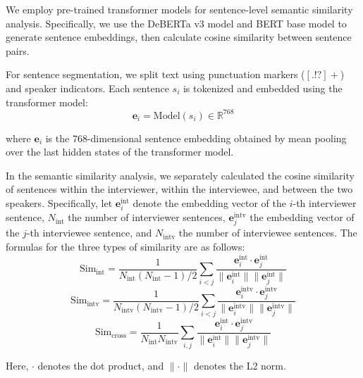 \documentclass[sigchi,nonacm,manuscript]{acmart}
\begin{document}
We employ pre-trained transformer models for sentence-level semantic similarity analysis. Specifically, we use the DeBERTa v3 model \citep{heDeBERTaV3ImprovingDeBERTa2021} and BERT base model \citep{devlinBERTPretrainingDeep2018} to generate sentence embeddings, then calculate cosine similarity between sentence pairs.

For sentence segmentation, we split text using punctuation markers ($[.!?]+$) and speaker indicators. Each sentence $s_i$ is tokenized and embedded using the transformer model:
\begin{equation}
\mathbf{e}_i = \text{Model}(s_i) \in \mathbb{R}^{768}
\end{equation}

where $\mathbf{e}_i$ is the 768-dimensional sentence embedding obtained by mean pooling over the last hidden states of the transformer model.

In the semantic similarity analysis, we separately calculated the cosine similarity of sentences within the interviewer, within the interviewee, and between the two speakers. Specifically, let $\mathbf{e}_i^{\text{int}}$ denote the embedding vector of the $i$-th interviewer sentence, $N_{\text{int}}$ the number of interviewer sentences, $\mathbf{e}_j^{\text{intv}}$ the embedding vector of the $j$-th interviewee sentence, and $N_{\text{intv}}$ the number of interviewee sentences. The formulas for the three types of similarity are as follows:
\begin{equation}
\text{Sim}_{\text{int}} = \frac{1}{N_{\text{int}}(N_{\text{int}}-1)/2} \sum_{i<j} \frac{\mathbf{e}_i^{\text{int}} \cdot \mathbf{e}_j^{\text{int}}}{\|\mathbf{e}_i^{\text{int}}\| \|\mathbf{e}_j^{\text{int}}\|}
\end{equation}
\begin{equation}
\text{Sim}_{\text{intv}} = \frac{1}{N_{\text{intv}}(N_{\text{intv}}-1)/2} \sum_{i<j} \frac{\mathbf{e}_i^{\text{intv}} \cdot \mathbf{e}_j^{\text{intv}}}{\|\mathbf{e}_i^{\text{intv}}\| \|\mathbf{e}_j^{\text{intv}}\|}
\end{equation}
\begin{equation}
\text{Sim}_{\text{cross}} = \frac{1}{N_{\text{int}} N_{\text{intv}}} \sum_{i,j} \frac{\mathbf{e}_i^{\text{int}} \cdot \mathbf{e}_j^{\text{intv}}}{\|\mathbf{e}_i^{\text{int}}\| \|\mathbf{e}_j^{\text{intv}}\|}
\end{equation}

Here, $\cdot$ denotes the dot product, and $\|\cdot\|$ denotes the L2 norm.
\end{document}
